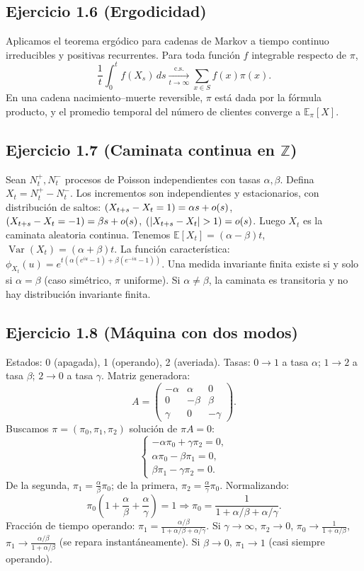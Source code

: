 \documentclass[12pt]{article}
\let\P\relax
\newcommand{\P}{\mathbb{P}}
\newcommand{\E}{\mathbb{E}}
\newcommand{\Z}{\mathbb{Z}}
\newcommand{\1}{\mathbf{1}}
\newcommand{\Var}{\operatorname{Var}}
\begin{document}
\subsection{Ejercicio 1.6 (Ergodicidad)}
Aplicamos el teorema erg\'odico para cadenas de Markov a tiempo continuo irreducibles y positivas recurrentes. Para toda funci\'on $f$ integrable respecto de $\pi$,
\[
\frac1t\int_0^t f(X_s)\,ds\xrightarrow[t\to\infty]{\text{c.s.}}\sum_{x\in S}f(x)\pi(x).
\]
En una cadena nacimiento--muerte reversible, $\pi$ est\'a dada por la f\'ormula producto, y el promedio temporal del n\'umero de clientes converge a $\E_\pi[X]$.

\subsection{Ejercicio 1.7 (Caminata continua en $\Z$)}
Sean $N^+_t,N^-_t$ procesos de Poisson independientes con tasas $\alpha,\beta$. Defina $X_t=N^+_t-N^-_t$. Los incrementos son independientes y estacionarios, con distribuci\'on de saltos: $\P(X_{t+s}-X_t=1)=\alpha s+o(s)$, $\P(X_{t+s}-X_t=-1)=\beta s+o(s)$, $\P(|X_{t+s}-X_t|>1)=o(s)$. Luego $X_t$ es la caminata aleatoria continua. Tenemos $\E[X_t]=(\alpha-\beta)t$, $\Var(X_t)=(\alpha+\beta)t$. La funci\'on caracter\'istica: $\phi_{X_t}(u)=e^{t(\alpha(e^{iu}-1)+\beta(e^{-iu}-1))}$. Una medida invariante finita existe si y solo si $\alpha=\beta$ (caso sim\'etrico, $\pi$ uniforme). Si $\alpha\neq\beta$, la caminata es transitoria y no hay distribuci\'on invariante finita.

\subsection{Ejercicio 1.8 (M\'aquina con dos modos)}
Estados: 0 (apagada), 1 (operando), 2 (averiada). Tasas: $0\to1$ a tasa $\alpha$; $1\to2$ a tasa $\beta$; $2\to0$ a tasa $\gamma$. Matriz generadora:
\[
A=\begin{pmatrix}
-\alpha & \alpha & 0\\
0 & -\beta & \beta\\
\gamma & 0 & -\gamma
\end{pmatrix}.
\]
Buscamos $\pi=(\pi_0,\pi_1,\pi_2)$ soluci\'on de $\pi A=0$:
\[
\begin{cases}
-\alpha\pi_0+\gamma\pi_2=0,\\
\alpha\pi_0-\beta\pi_1=0,\\
\beta\pi_1-\gamma\pi_2=0.
\end{cases}
\]
De la segunda, $\pi_1=\frac{\alpha}{\beta}\pi_0$; de la primera, $\pi_2=\frac{\alpha}{\gamma}\pi_0$. Normalizando:
\[
\pi_0\left(1+\frac{\alpha}{\beta}+\frac{\alpha}{\gamma}\right)=1\Rightarrow \pi_0=\frac{1}{1+\alpha/\beta+\alpha/\gamma}.
\]
Fracci\'on de tiempo operando: $\pi_1=\frac{\alpha/\beta}{1+\alpha/\beta+\alpha/\gamma}$. Si $\gamma\to\infty$, $\pi_2\to0$, $\pi_0\to\frac{1}{1+\alpha/\beta}$, $\pi_1\to\frac{\alpha/\beta}{1+\alpha/\beta}$ (se repara instant\'aneamente). Si $\beta\to0$, $\pi_1\to1$ (casi siempre operando).
\end{document}
